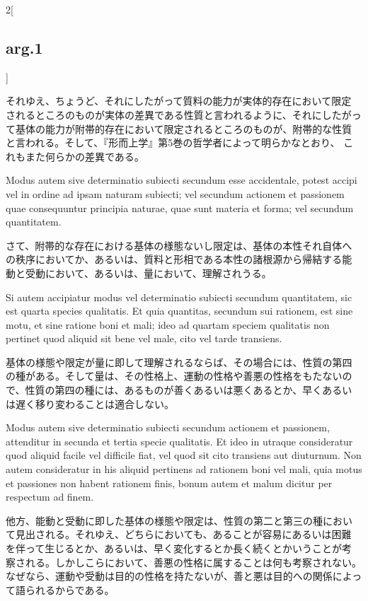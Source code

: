 \documentclass[paper=a4paper,fontsize=10pt,jafontsize=9pt,titlepage]{jlreq}
\begin{document}
\begin{paracol}{2}[\subsection{arg.1}]
\switchcolumn

それゆえ、ちょうど、それにしたがって質料の能力が実体的存在において限定
されるところのものが実体の差異である性質と言われるように、それにしたがっ
て基体の能力が附帯的存在において限定されるところのものが、附帯的な性質
と言われる。そして、『形而上学』第5巻の哲学者によって明らかなとおり、
これもまた何らかの差異である。

\switchcolumn*

Modus autem sive
determinatio subiecti secundum esse accidentale, potest accipi vel in
ordine ad ipsam naturam subiecti; vel secundum actionem et passionem
quae consequuntur principia naturae, quae sunt materia et forma; vel
secundum quantitatem.

\switchcolumn

さて、附帯的な存在における基体の様態ないし限定は、基体の本性それ自体へ
の秩序においてか、あるいは、質料と形相である本性の諸根源から帰結する能
動と受動において、あるいは、量において、理解されうる。

\switchcolumn*

Si autem accipiatur modus vel determinatio
subiecti secundum quantitatem, sic est quarta species qualitatis. Et
quia quantitas, secundum sui rationem, est sine motu, et sine ratione
boni et mali; ideo ad quartam speciem qualitatis non pertinet quod
aliquid sit bene vel male, cito vel tarde transiens.

\switchcolumn

基体の様態や限定が量に即して理解されるならば、その場合には、性質の第四
の種がある。そして量は、その性格上、運動の性格や善悪の性格をもたないの
で、性質の第四の種には、あるものが善くあるいは悪くあるとか、早くあるい
は遅く移り変わることは適合しない。

\switchcolumn*

Modus autem sive
determinatio subiecti secundum actionem et passionem, attenditur in
secunda et tertia specie qualitatis. Et ideo in utraque consideratur
quod aliquid facile vel difficile fiat, vel quod sit cito transiens
aut diuturnum. Non autem consideratur in his aliquid pertinens ad
rationem boni vel mali, quia motus et passiones non habent rationem
finis, bonum autem et malum dicitur per respectum ad finem.

\switchcolumn

他方、能動と受動に即した基体の様態や限定は、性質の第二と第三の種におい
て見出される。それゆえ、どちらにおいても、あることが容易にあるいは困難
を伴って生じるとか、あるいは、早く変化するとか長く続くとかいうことが考
察される。しかしこらにおいて、善悪の性格に属することは何も考察されない。
なぜなら、運動や受動は目的の性格を持たないが、善と悪は目的への関係によっ
て語られるからである。


\end{paracol}
\end{document}
